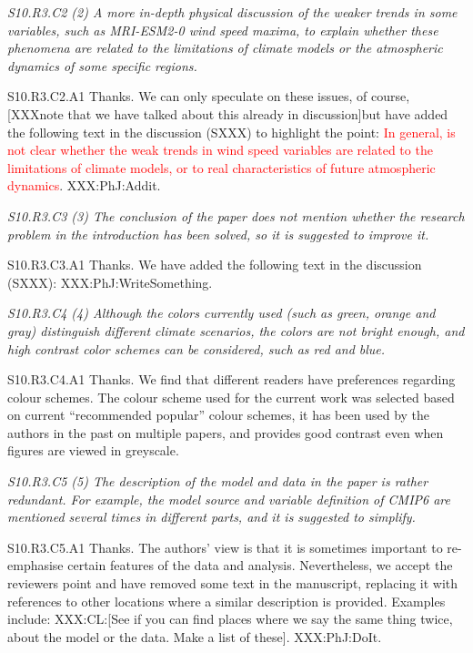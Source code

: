 \documentclass[a4paper,10pt]{article}
\newcommand{\ed}[1]{\textcolor{red}{#1}}
\begin{document}
	\emph{S10.R3.C2 (2) A more in-depth physical discussion of the weaker trends in some variables, such as MRI-ESM2-0 wind speed maxima, to explain whether these phenomena are related to the limitations of climate models or the atmospheric dynamics of some specific regions.}

	S10.R3.C2.A1 Thanks. We can only speculate on these issues, of course, [XXXnote that we have talked about this already in discussion]but have added the following text in the discussion (SXXX) to highlight the point: \ed{In general, is not clear whether the weak trends in wind speed variables are related to the limitations of climate models, or to real characteristics of future atmospheric dynamics}. XXX:PhJ:Addit. 

	\emph{S10.R3.C3 (3) The conclusion of the paper does not mention whether the research problem in the introduction has been solved, so it is suggested to improve it.}

	S10.R3.C3.A1 Thanks. We have added the following text in the discussion (SXXX): XXX:PhJ:WriteSomething.

	\emph{S10.R3.C4 (4) Although the colors currently used (such as green, orange and gray) distinguish different climate scenarios, the colors are not bright enough, and high contrast color schemes can be considered, such as red and blue.}

	S10.R3.C4.A1 Thanks. We find that different readers have preferences regarding colour schemes. The colour scheme used for the current work was selected based on current ``recommended popular'' colour schemes, it has been used by the authors in the past on multiple papers, and provides good contrast even when figures are viewed in greyscale.

	\emph{S10.R3.C5 (5) The description of the model and data in the paper is rather redundant. For example, the model source and variable definition of CMIP6 are mentioned several times in different parts, and it is suggested to simplify.}

	S10.R3.C5.A1 Thanks. The authors' view is that it is sometimes important to re-emphasise certain features of the data and analysis. Nevertheless, we accept the reviewers point and have removed some text in the manuscript, replacing it with references to other locations where a similar description is provided. Examples include: XXX:CL:[See if you can find places where we say the same thing twice, about the model or the data. Make a list of these]. XXX:PhJ:DoIt.
\end{document}
